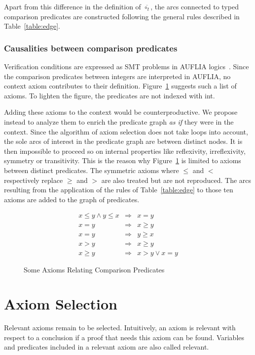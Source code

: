 \documentclass{acm_proc_article-sp}
\theoremstyle{nonumberplain}
\begin{document}
Apart from this difference in the definition of $\overline{\circ_t}$,
the arcs connected to typed comparison predicates are constructed
following the general rules described in Table~\ref{table:edge}.


\subsubsection{Causalities between comparison predicates}
Verification conditions are expressed as SMT problems in AUFLIA
logics~\cite{RanTin-SMTLIB}. Since the comparison predicates between
integers are interpreted in AUFLIA, no context axiom contributes to
their definition. Figure~\ref{comp:ax:fig} suggests such a list of
axioms. To lighten the figure, the predicates are not
indexed with \textsf{int}. 


Adding these axioms to the context would be counterproductive. We
propose instead to analyze them to enrich the predicate graph \emph{as
if} they were in the context. Since the algorithm of axiom selection
does not take loops into account, the sole arcs of interest in the
predicate graph are between distinct nodes. It is then impossible to
proceed so on internal properties like reflexivity, irreflexivity,
symmetry or transitivity. This is the reason why
Figure~\ref{comp:ax:fig} is limited to axioms between distinct
predicates. The symmetric axioms where $\le$ and $<$ respectively
replace $\ge$ and $>$ are also treated but are not reproduced. The arcs
resulting from the application of the rules of Table~\ref{table:edge}
to those ten axioms are added to the graph of predicates.


 \begin{figure}
\begin{eqnarray}
x \le y \land y \le x & \Rightarrow & x = y \\
x = y & \Rightarrow & x \ge y \\
x = y & \Rightarrow & y \ge x \\
x > y & \Rightarrow & x \ge y \\
x \ge y & \Rightarrow & x > y \lor x = y
\end{eqnarray}
\caption{Some Axioms Relating Comparison Predicates
\label{comp:ax:fig}}
\end{figure}


\section{Axiom Selection}\label{sub:rel:hyp}
Relevant axioms remain to be selected. Intuitively, an axiom is
relevant with respect to a conclusion if a proof that needs this axiom
can be found. Variables and predicates included in a relevant axiom are
also called relevant.
\end{document}

